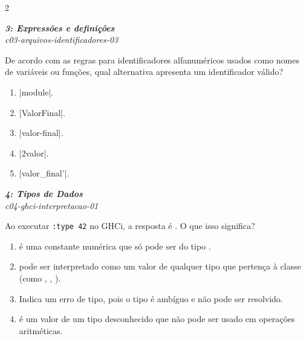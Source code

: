 \documentclass[a4paper,10pt,brazil]{article}
\begin{document}
\begin{multicols}{2}
\begin{flushright}
  \footnotesize
  \textit{\textbf{3: Expressões e definições}}\\
  \textit{c03-arquivos-identificadores-03}\\

\end{flushright}
De acordo com as regras para identificadores alfanuméricos usados como nomes de variáveis ou funções, qual alternativa apresenta um identificador válido?

\begin{enumerate}
  \item \haskellinline|module|.

  \item \haskellinline|ValorFinal|.

  \item \haskellinline|valor-final|.

  \item \haskellinline|2valor|.

  \item \haskellinline|valor_final'|.


\end{enumerate}

\begin{flushright}
  \footnotesize
  \textit{\textbf{4: Tipos de Dados}}\\
  \textit{c04-ghci-interpretacao-01}\\

\end{flushright}
Ao executar \texttt{:type 42} no GHCi, a resposta é . O que isso significa?

\begin{enumerate}
  \item {} é uma constante numérica que só pode ser do tipo .

  \item {} pode ser interpretado como um valor de qualquer tipo que pertença à classe  (como , , ).

  \item Indica um erro de tipo, pois o tipo é ambíguo e não pode ser resolvido.

  \item {} é um valor de um tipo desconhecido que não pode ser usado em operações aritméticas.


\end{enumerate}
\end{multicols}
\end{document}
